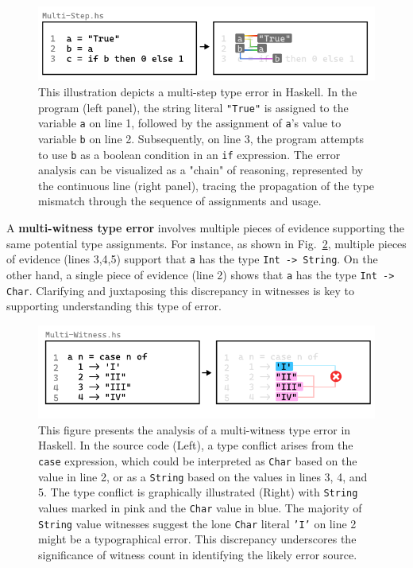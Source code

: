 \begin{figure}[htbp]
  \includegraphics[width=\linewidth]{Multi-Step}
  \caption[This illustration depicts a multi-step type error in Haskell]{
    \label{fig:multi-step-example}
    This illustration depicts a multi-step type error in Haskell. In the program (left panel), the string literal \texttt{"True"} is assigned to the variable \texttt{a} on line 1, followed by the assignment of \texttt{a}'s value to variable \texttt{b} on line 2. Subsequently, on line 3, the program attempts to use \texttt{b} as a boolean condition in an \texttt{if} expression. The error analysis can be visualized as a "chain" of reasoning, represented by the continuous line (right panel), tracing the propagation of the type mismatch through the sequence of assignments and usage. }
\end{figure}

A \textbf{multi-witness type error} involves multiple pieces of evidence supporting the same potential type assignments. For instance, as shown in Fig.~\ref{fig:multi-witness-example}, multiple pieces of evidence (lines 3,4,5) support that \texttt{a} has the type \texttt{Int -> String}. On the other hand, a single piece of evidence (line 2) shows that \texttt{a} has the type \texttt{Int -> Char}.  Clarifying and juxtaposing this discrepancy in witnesses is key to supporting understanding this type of error.

\begin{figure}[htbp]
\centering  \includegraphics[width=\linewidth]{Multi-Witness}
  \caption[This illustration depicts a multi-witness type error in Haskell]{
    \label{fig:multi-witness-example}
    This figure presents the analysis of a multi-witness type error in Haskell. In the source code (Left), a type conflict arises from the \texttt{case} expression, which could be interpreted as \texttt{Char} based on the value in line 2, or as a \texttt{String} based on the values in lines 3, 4, and 5. The type conflict is graphically illustrated (Right) with \texttt{String} values marked in pink and the \texttt{Char} value in blue. The majority of \texttt{String} value witnesses suggest the lone \texttt{Char} literal \texttt{'I'} on line 2 might be a typographical error. This discrepancy underscores the significance of witness count in identifying the likely error source.}
\end{figure}

